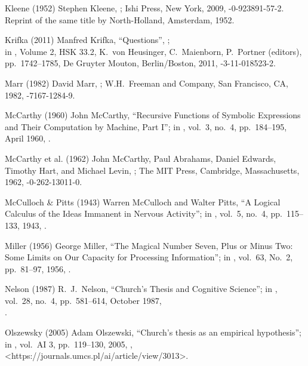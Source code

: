  Kleene (1952)
Stephen Kleene,
;
Ishi Press, New York, 2009,
-0-923891-57-2.
Reprint of the same title by
North-Holland, Amsterdam, 1952.

 Krifka (2011)
Manfred Krifka,
``Questions'',
;\\
in ,
 Volume 2, HSK 33.2,
 K.\ von Heusinger, C.\ Maienborn, P.\ Portner (editors),
pp.\ 1742--1785,
De Gruyter Mouton, Berlin/Boston, 2011,
-3-11-018523-2.

 Marr (1982)
David Marr,
;
W.H.\ Freeman and Company, San Francisco, CA, 1982,
-7167-1284-9.

 McCarthy (1960)
John McCarthy,
``Recursive Functions of Symbolic Expressions
and Their Computation by Machine, Part I'';
in ,
vol.\ 3, no.\ 4, pp.\ 184--195, April 1960,
.

 McCarthy et al. (1962)
John McCarthy, Paul Abrahams, Daniel Edwards,
Timothy Hart, and Michael Levin,
 ;
The MIT Press,
Cambridge, Massachusetts, 1962,
-0-262-13011-0.

 McCulloch \& Pitts (1943)
Warren McCulloch and Walter Pitts,
``A Logical Calculus of the Ideas Immanent in Nervous Activity'';
in ,
vol.\ 5, no.\ 4, pp.\ 115--133, 1943,
.

 Miller (1956)
 George Miller,
``The Magical Number Seven, Plus or Minus Two:
Some Limits on Our Capacity for Processing Information'';
in ,
vol.\ 63, No.\ 2, pp.\ 81--97, 1956,
.

 Nelson (1987)
R.\ J.\ Nelson,
``Church's Thesis and Cognitive Science'';
in ,
vol.\ 28, no.\ 4, pp.\ 581--614, October 1987,\\
.

 Olszewsky (2005)
Adam Olszewski,
``Church's thesis as an empirical hypothesis'';
in ,
vol.\ AI 3, pp.\ 119--130, 2005,
,
\URL<https://journals.umcs.pl/ai/article/view/3013>.

